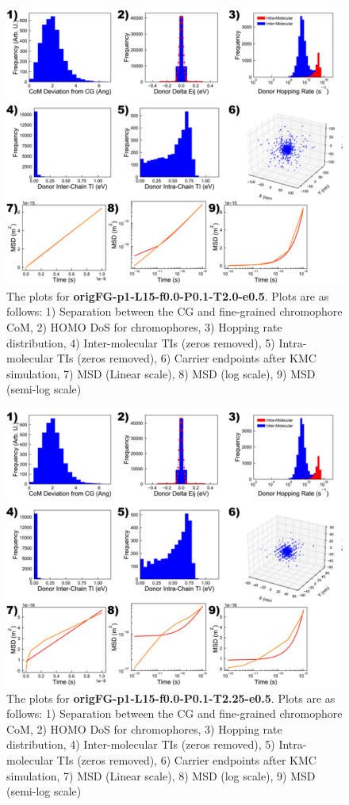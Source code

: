 \documentclass[12pt]{article}
\begin{document}
\begin{figure}[p]\centering
	\includegraphics[width=\textwidth]{Figures/T2_0.png}
    \caption{The plots for \textbf{origFG-p1-L15-f0.0-P0.1-T2.0-e0.5}. Plots are as follows: 1) Separation between the CG and fine-grained chromophore CoM, 2) HOMO DoS for chromophores, 3) Hopping rate distribution, 4) Inter-molecular TIs (zeros removed), 5) Intra-molecular TIs (zeros removed), 6) Carrier endpoints after KMC simulation, 7) MSD (Linear scale), 8) MSD (log scale), 9) MSD (semi-log scale)}
	\label{fig:T2.0}
\end{figure}

\begin{figure}[p]\centering
	\includegraphics[width=\textwidth]{Figures/T2_25.png}
    \caption{The plots for \textbf{origFG-p1-L15-f0.0-P0.1-T2.25-e0.5}. Plots are as follows: 1) Separation between the CG and fine-grained chromophore CoM, 2) HOMO DoS for chromophores, 3) Hopping rate distribution, 4) Inter-molecular TIs (zeros removed), 5) Intra-molecular TIs (zeros removed), 6) Carrier endpoints after KMC simulation, 7) MSD (Linear scale), 8) MSD (log scale), 9) MSD (semi-log scale)}
	\label{fig:T2.25}
\end{figure}
\end{document}
